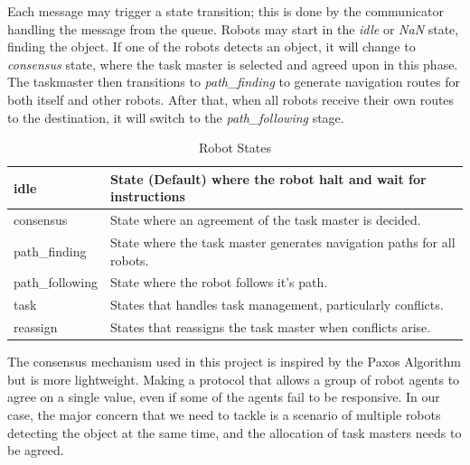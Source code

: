 \newpage

Each message may trigger a state transition; this is done by the communicator handling the message from the queue. Robots may start in the \textit{idle} or \textit{NaN} state, finding the object. If one of the robots detects an object, it will change to \textit{consensus} state, where the task master is selected and agreed upon in this phase. The taskmaster then transitions to \textit{path\_finding} to generate navigation routes for both itself and other robots. After that, when all robots receive their own routes to the destination, it will switch to the \textit{path\_following} stage.

\begin{table}[ht]
\centering
\begin{tabular}{|p{3cm}|p{12cm}|}
\hline
 idle & State (Default) where the robot halt and wait for instructions\\ \hline
 consensus & State where an agreement of the task master is decided.\\ \hline
 path\_finding & State where the task master generates navigation paths for all robots.\\ \hline
 path\_following &  State where the robot follows it's path.\\ \hline
 task & States that handles task management, particularly conflicts.\\ \hline
 reassign & States that reassigns the task master when conflicts arise.\\ \hline
\end{tabular}
\caption{Robot States}
\end{table}

The consensus mechanism used in this project is inspired by the Paxos Algorithm but is more lightweight. Making a protocol that allows a group of robot agents to agree on a single value, even if some of the agents fail to be responsive. In our case, the major concern that we need to tackle is a scenario of multiple robots detecting the object at the same time, and the allocation of task masters needs to be agreed.

